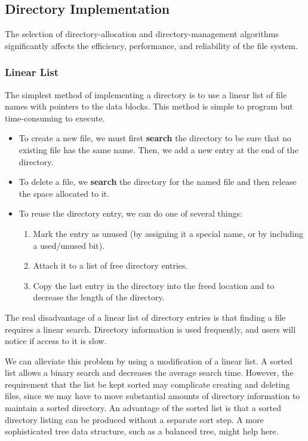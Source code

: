 \subsection{Directory Implementation}\label{subsec:Directory_Implementation}
The selection of directory-allocation and directory-management algorithms significantly affects the efficiency, performance, and reliability of the file system.

\subsubsection{Linear List}\label{subsubsec:Linear_List_Directory}
The simplest method of implementing a directory is to use a linear list of file names with pointers to the data blocks.
This method is simple to program but time-consuming to execute.
\begin{itemize}[noitemsep]
\item To create a new file, we must first \textbf{search} the directory to be sure that no existing file has the same name.
  Then, we add a new entry at the end of the directory.
\item To delete a file, we \textbf{search} the directory for the named file and then release the space allocated to it.
\item To reuse the directory entry, we can do one of several things:
  \begin{enumerate}[noitemsep]
  \item Mark the entry as unused (by assigning it a special name, or by including a used/unused bit).
  \item Attach it to a list of free directory entries.
  \item Copy the last entry in the directory into the freed location and to decrease the length of the directory.
  \end{enumerate}
\end{itemize}

The real disadvantage of a linear list of directory entries is that finding a file requires a linear search.
Directory information is used frequently, and users will notice if access to it is slow.

We can alleviate this problem by using a modification of a linear list.
A sorted list allows a binary search and decreases the average search time.
However, the requirement that the list be kept sorted may complicate creating and deleting files, since we may have to move substantial amounts of directory information to maintain a sorted directory.
An advantage of the sorted list is that a sorted directory listing can be produced without a separate sort step.
A more sophisticated tree data structure, such as a balanced tree, might help here.


